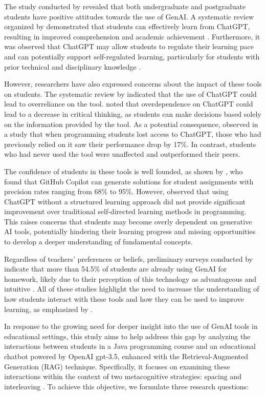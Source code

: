 \documentclass[a4paper,twoside]{article}
\begin{document}
The study conducted by \cite{chan23} revealed that both undergraduate and
postgraduate students have positive attitudes towards the use of GenAI.
A systematic review organized by \cite{Lo24} demonstrated that students can
effectively learn from ChatGPT, resulting in improved comprehension and academic
achievement \citep{Callejo24}. Furthermore, it was observed that ChatGPT may
allow students to regulate their learning pace and can potentially support
self-regulated learning, particularly for students with prior technical and
disciplinary knowledge \citep{Xia23}.

However, researchers have also expressed concerns about the impact of these
tools on students. The systematic review by \cite{Murillo23} indicated that the
use of ChatGPT could lead to overreliance on the tool. \cite{chan23} noted that
overdependence on ChatGPT could lead to a decrease in critical thinking, as
students can make decisions based solely on the information provided by the
tool. As a potential consequence, \cite{Bastani24} observed in a study that when
programming students lost access to ChatGPT, those who had previously relied
on it saw their performance drop by 17\%. In contrast, students who had never
used the tool were unaffected and outperformed their peers.

The confidence of students in these tools is well founded, as shown by
\cite{Puryear22}, who found that GitHub Copilot can generate solutions for
student assignments with precision rates ranging from 68\% to 95\%. However,
\cite{Boudouaia24} observed that using ChatGPT without a structured learning
approach did not provide significant improvement over traditional self-directed
learning methods in programming. This raises concerns that students may become
overly dependent on generative AI tools, potentially hindering their learning
progress and missing opportunities to develop a deeper understanding of
fundamental concepts.

Regardless of teachers' preferences or beliefs, preliminary surveys conducted
by \cite{Dickey24} indicate that more than 54.5\% of students are already using
GenAI for homework, likely due to their perception of this technology as
advantageous and intuitive \citep{Boudouaia24}. All of these studies highlight
the need to increase the understanding of how students interact with these tools
and how they can be used to improve learning, as emphasized by \cite{Lo24}.

In response to the growing need for deeper insight into the use of GenAI tools
in educational settings, this study aims to help address this gap by analyzing
the interactions between students in a Java programming course and an
educational chatbot powered by OpenAI gpt-3.5, enhanced with the
Retrieval-Augmented Generation (RAG) technique. Specifically, it focuses on
examining these interactions within the context of two metacognitive strategies:
spacing \citep{Carvalho20} and interleaving \citep{Rivers21}. To achieve this
objective, we formulate three research questions:
\end{document}
